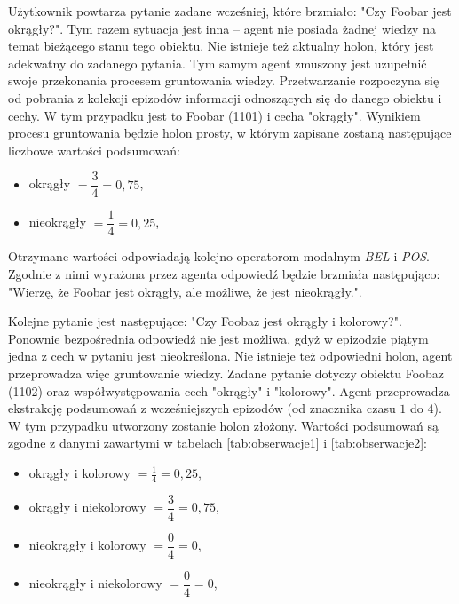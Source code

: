 Użytkownik powtarza pytanie zadane wcześniej, które brzmiało: "Czy Foobar jest okrągły?". Tym razem sytuacja jest inna -- agent nie posiada żadnej wiedzy na temat bieżącego stanu tego obiektu. Nie istnieje też aktualny holon, który jest adekwatny do zadanego pytania. Tym samym agent zmuszony jest uzupełnić swoje przekonania procesem gruntowania wiedzy. Przetwarzanie rozpoczyna się od pobrania z kolekcji epizodów informacji odnoszących się do danego obiektu i cechy. W tym przypadku jest to Foobar (1101) i cecha "okrągły". Wynikiem procesu gruntowania będzie holon prosty, w którym zapisane zostaną następujące liczbowe wartości podsumowań:

\begin{itemize}
	\setlength{\itemindent}{.5in}
	\item okrągły $ = \dfrac{3}{4} = 0,75 $,
	\vspace{0.1in}
	\item nieokrągły $ = \dfrac{1}{4} = 0,25 $,
\end{itemize}  

Otrzymane wartości odpowiadają kolejno operatorom modalnym \textit{BEL} i \textit{POS}. Zgodnie z nimi wyrażona przez agenta odpowiedź będzie brzmiała następująco: "Wierzę, że Foobar jest okrągły, ale możliwe, że jest nieokrągły.".

Kolejne pytanie jest następujące: "Czy Foobaz jest okrągły i kolorowy?". Ponownie bezpośrednia odpowiedź nie jest możliwa, gdyż w epizodzie piątym jedna z cech w pytaniu jest nieokreślona. Nie istnieje też odpowiedni holon, agent przeprowadza więc gruntowanie wiedzy. Zadane pytanie dotyczy obiektu Foobaz (1102) oraz współwystępowania cech "okrągły" i "kolorowy". Agent przeprowadza ekstrakcję podsumowań z wcześniejszych epizodów (od znacznika czasu $ 1 $ do $ 4 $). W tym przypadku utworzony zostanie holon złożony. Wartości podsumowań są zgodne z danymi zawartymi w tabelach \ref{tab:obserwacje1} i \ref{tab:obserwacje2}:

\begin{itemize}
	\setlength{\itemindent}{.5in}
	\item okrągły i kolorowy $ = \frac{1}{4} = 0,25 $,
	\vspace{0.1in}
	\item okrągły i niekolorowy $ = \dfrac{3}{4} = 0,75 $,
	\vspace{0.1in}
	\item nieokrągły i kolorowy $ = \dfrac{0}{4} = 0 $,
	\vspace{0.1in}
	\item nieokrągły i niekolorowy $ = \dfrac{0}{4} = 0 $,
\end{itemize}  

